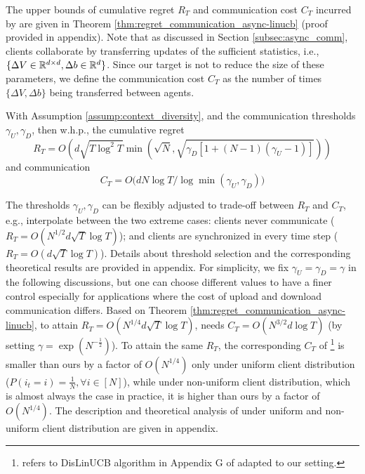 The upper bounds of cumulative regret $R_{T}$ and communication cost $C_{T}$ incurred by \modelone{} are given in Theorem \ref{thm:regret_communication_async-linucb} (proof provided in appendix). Note that as discussed in Section \ref{subsec:async_comm}, clients collaborate by transferring updates of the sufficient statistics, i.e., $\{ \Delta V \in \mathbb{R}^{d \times d},\Delta b \in \mathbb{R}^{d}\}$. Since our target is not to reduce the size of these parameters, we define the communication cost $C_{T}$ as the number of times $\{ \Delta V,\Delta b\}$ being transferred between agents.
\begin{theorem} \label{thm:regret_communication_async-linucb}
With Assumption \ref{assump:context_diversity}, and the communication thresholds $\gamma_{U},\gamma_{D}$, then w.h.p., the cumulative regret $$R_{T} = O\left(d\sqrt{T\log^{2}{T}}\min(\sqrt{N},\sqrt{\gamma_{D} [1+(N-1)(\gamma_{U}-1)]})\right)$$ and communication $$C_{T} = O\bigl(d N {\log{T}}/{\log{\min{(\gamma_{U},\gamma_{D})}}}\bigr)$$
\end{theorem}
The thresholds $\gamma_{U},\gamma_{D}$ can be flexibly adjusted to trade-off between $R_{T}$ and $C_{T}$, e.g., interpolate between the two extreme cases: clients never communicate ($R_{T}=O(N^{1/2}d\sqrt{T}\log{T})$); and clients are synchronized in every time step ($R_{T}=O(d\sqrt{T}\log{T})$). Details about threshold selection and the corresponding theoretical results are provided in appendix. For simplicity, we fix $\gamma_{U}=\gamma_{D}=\gamma$ in the following discussions, but one can choose different values to have a finer control especially for applications where the cost of upload and download communication differs. 
Based on Theorem \ref{thm:regret_communication_async-linucb}, to attain $R_{T}=O(N^{1/4}d\sqrt{T}\log{T})$, \modelone{} needs $C_{T}=O(N^{3/2}d\log{T})$ (by setting $\gamma=\exp(N^{-\frac{1}{2}})$). To attain the same $R_{T}$, the corresponding $C_{T}$ of \modelbaseline{} \footnote{\modelbaseline{} refers to DisLinUCB algorithm in Appendix G of \citep{wang2019distributed} adapted to our setting.} is smaller than ours by a factor of $O(N^{1/4})$ only under uniform client distribution ($P(i_{t}=i) = \frac{1}{N},\forall i\in[N]$), while under non-uniform client distribution, which is almost always the case in practice, it is higher than ours by a factor of $O(N^{1/4})$. The description and theoretical analysis of \modelbaseline{} under uniform and non-uniform client distribution are given in appendix.
